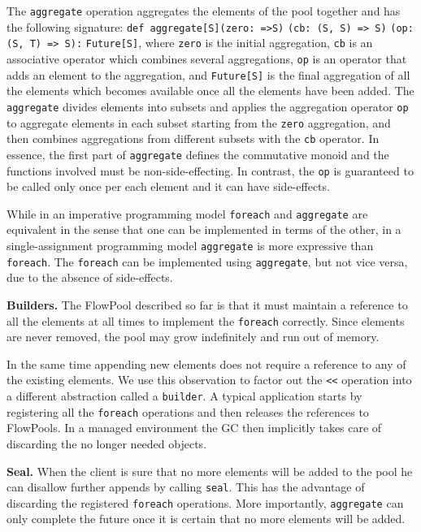 \documentclass[runningheads,a4paper]{llncs}
\begin{document}
The \verb=aggregate= operation aggregates the elements of the pool
together and has the following signature: \verb+def aggregate[S]+\verb+(zero: =>S)+
\verb+(cb: (S, S) => S)+ \verb+(op: (S, T) => S):+ \verb+Future[S]+,
where \verb=zero= is the initial aggregation, \verb=cb= is an
associative operator which combines several aggregations, \verb=op= is
an operator that adds an element to the aggregation, and
\verb=Future[S]= is the final aggregation of all the elements which
becomes available once all the elements have been added.
The \verb=aggregate= divides elements into subsets and applies the
aggregation operator \verb=op= to aggregate elements in each subset
starting from the \verb=zero= aggregation, and then combines
aggregations from different subsets with the \verb=cb= operator.
In essence, the first part of \verb=aggregate= defines the commutative
monoid and the functions involved must be non-side-effecting.
In contrast, the \verb=op= is guaranteed to be called only once per
each element and it can have side-effects.

While in an imperative programming model \verb=foreach= and \verb=aggregate= are
equivalent in the sense that one can be implemented in terms of the
other, in a single-assignment programming model \verb=aggregate= is more
expressive than \verb=foreach=.
The \verb=foreach= can be implemented using \verb=aggregate=, but not vice versa,
due to the absence of side-effects.

\textbf{Builders.}
The FlowPool described so far is that it must maintain a reference 
to all the elements at all times to implement the \verb=foreach=
correctly.
Since elements are never removed, the pool may grow indefinitely
and run out of memory.

In the same time appending new elements does not require a reference
to any of the existing elements.
We use this observation to factor out the \verb=<<= operation into
a different abstraction called a \verb=builder=.
A typical application starts by registering all the \verb=foreach=
operations and then releases the references to FlowPools.
In a managed environment the GC then implicitly takes care of
discarding the no longer needed objects.


\textbf{Seal.}
When the client is sure that no more elements will be added to the pool
he can disallow further appends by calling \verb=seal=.
This has the advantage of discarding the registered \verb=foreach=
operations.
More importantly, \verb=aggregate= can only complete the future
once it is certain that no more elements will be added.
\end{document}
